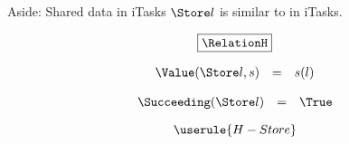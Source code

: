 \begin{margintext}{Aside: Shared data in iTasks}
  $\Store l$ is similar to  in iTasks.
\end{margintext}

\begin{equation*}
  \boxed{\RelationH}
\end{equation*}

\begin{equation*}
  \begin{array}{lcl}
    \Value(\Store l, s) &=& s(l)
  \end{array}
\end{equation*}

\begin{equation*}
  \begin{array}{lcl}
    \Succeeding(\Store l) &=& \True
  \end{array}
\end{equation*}

\begin{equation*}
  \userule{H-Store}
\end{equation*}

